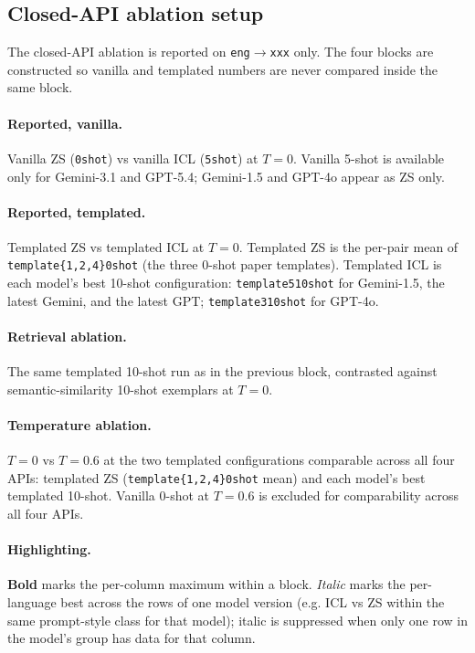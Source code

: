 \subsection{Closed-API ablation setup}
\label{app:closed_ablations_notes}

The closed-API ablation is reported on \texttt{eng}$\to$\texttt{xxx} only. The four blocks are constructed so vanilla and templated numbers are never compared inside the same block.

\paragraph{Reported, vanilla.} Vanilla ZS (\texttt{0shot}) vs vanilla ICL (\texttt{5shot}) at $T{=}0$. Vanilla 5-shot is available only for Gemini-3.1 and GPT-5.4; Gemini-1.5 and GPT-4o appear as ZS only.

\paragraph{Reported, templated.} Templated ZS vs templated ICL at $T{=}0$. Templated ZS is the per-pair mean of \texttt{template\{1,2,4\}\textunderscore{}0shot} (the three 0-shot paper templates). Templated ICL is each model's best 10-shot configuration: \texttt{template5\textunderscore{}10shot} for Gemini-1.5, the latest Gemini, and the latest GPT; \texttt{template3\textunderscore{}10shot} for GPT-4o.

\paragraph{Retrieval ablation.} The same templated 10-shot run as in the previous block, contrasted against semantic-similarity 10-shot exemplars at $T{=}0$.

\paragraph{Temperature ablation.} $T{=}0$ vs $T{=}0.6$ at the two templated configurations comparable across all four APIs: templated ZS (\texttt{template\{1,2,4\}\textunderscore{}0shot} mean) and each model's best templated 10-shot. Vanilla 0-shot at $T{=}0.6$ is excluded for comparability across all four APIs.

\paragraph{Highlighting.} \textbf{Bold} marks the per-column maximum within a block. \emph{Italic} marks the per-language best across the rows of one model version (e.g. ICL vs ZS within the same prompt-style class for that model); italic is suppressed when only one row in the model's group has data for that column.
